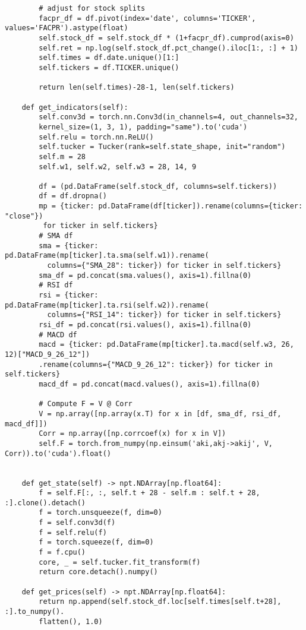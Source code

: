 \begin{verbatim}
        # adjust for stock splits
        facpr_df = df.pivot(index='date', columns='TICKER', values='FACPR').astype(float)
        self.stock_df = self.stock_df * (1+facpr_df).cumprod(axis=0)
        self.ret = np.log(self.stock_df.pct_change().iloc[1:, :] + 1)
        self.times = df.date.unique()[1:]
        self.tickers = df.TICKER.unique()

        return len(self.times)-28-1, len(self.tickers)

    def get_indicators(self):
        self.conv3d = torch.nn.Conv3d(in_channels=4, out_channels=32,
        kernel_size=(1, 3, 1), padding="same").to('cuda')
        self.relu = torch.nn.ReLU()
        self.tucker = Tucker(rank=self.state_shape, init="random")
        self.m = 28
        self.w1, self.w2, self.w3 = 28, 14, 9
        
        df = (pd.DataFrame(self.stock_df, columns=self.tickers))
        df = df.dropna()
        mp = {ticker: pd.DataFrame(df[ticker]).rename(columns={ticker: "close"})
         for ticker in self.tickers}
        # SMA df
        sma = {ticker: pd.DataFrame(mp[ticker].ta.sma(self.w1)).rename(
          columns={"SMA_28": ticker}) for ticker in self.tickers}
        sma_df = pd.concat(sma.values(), axis=1).fillna(0)
        # RSI df
        rsi = {ticker: pd.DataFrame(mp[ticker].ta.rsi(self.w2)).rename(
          columns={"RSI_14": ticker}) for ticker in self.tickers}
        rsi_df = pd.concat(rsi.values(), axis=1).fillna(0)
        # MACD df
        macd = {ticker: pd.DataFrame(mp[ticker].ta.macd(self.w3, 26, 12)["MACD_9_26_12"])
        .rename(columns={"MACD_9_26_12": ticker}) for ticker in self.tickers}
        macd_df = pd.concat(macd.values(), axis=1).fillna(0)

        # Compute F = V @ Corr
        V = np.array([np.array(x.T) for x in [df, sma_df, rsi_df, macd_df]])
        Corr = np.array([np.corrcoef(x) for x in V])
        self.F = torch.from_numpy(np.einsum('aki,akj->akij', V, Corr)).to('cuda').float()


    def get_state(self) -> npt.NDArray[np.float64]:
        f = self.F[:, :, self.t + 28 - self.m : self.t + 28, :].clone().detach()      
        f = torch.unsqueeze(f, dim=0) 
        f = self.conv3d(f)
        f = self.relu(f)
        f = torch.squeeze(f, dim=0)
        f = f.cpu()
        core, _ = self.tucker.fit_transform(f)
        return core.detach().numpy()

    def get_prices(self) -> npt.NDArray[np.float64]:
        return np.append(self.stock_df.loc[self.times[self.t+28], :].to_numpy().
        flatten(), 1.0)
\end{verbatim}


